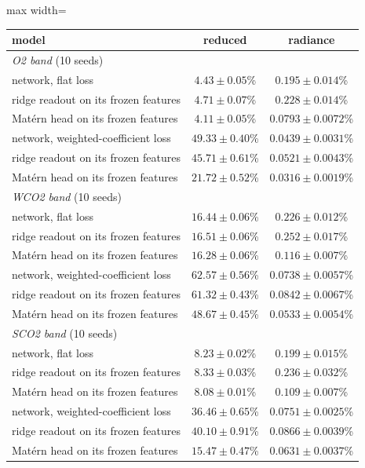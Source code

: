\documentclass[twoside,11pt]{article}
\begin{document}
\begin{table}[t]
\centering

\begin{adjustbox}{max width=\linewidth}
\begin{tabular}{lcc}
\toprule
model & reduced & radiance \\
\midrule
\multicolumn{3}{l}{\emph{O2 band} (10 seeds)} \\
network, flat loss & $4.43\pm0.05$\% & $0.195\pm0.014$\% \\
\quad ridge readout on its frozen features & $4.71\pm0.07$\% & $0.228\pm0.014$\% \\
\quad Mat\'ern head on its frozen features & $4.11\pm0.05$\% & $0.0793\pm0.0072$\% \\
network, weighted-coefficient loss & $49.33\pm0.40$\% & $0.0439\pm0.0031$\% \\
\quad ridge readout on its frozen features & $45.71\pm0.61$\% & $0.0521\pm0.0043$\% \\
\quad Mat\'ern head on its frozen features & $21.72\pm0.52$\% & $0.0316\pm0.0019$\% \\
\multicolumn{3}{l}{\emph{WCO2 band} (10 seeds)} \\
network, flat loss & $16.44\pm0.06$\% & $0.226\pm0.012$\% \\
\quad ridge readout on its frozen features & $16.51\pm0.06$\% & $0.252\pm0.017$\% \\
\quad Mat\'ern head on its frozen features & $16.28\pm0.06$\% & $0.116\pm0.007$\% \\
network, weighted-coefficient loss & $62.57\pm0.56$\% & $0.0738\pm0.0057$\% \\
\quad ridge readout on its frozen features & $61.32\pm0.43$\% & $0.0842\pm0.0067$\% \\
\quad Mat\'ern head on its frozen features & $48.67\pm0.45$\% & $0.0533\pm0.0054$\% \\
\multicolumn{3}{l}{\emph{SCO2 band} (10 seeds)} \\
network, flat loss & $8.23\pm0.02$\% & $0.199\pm0.015$\% \\
\quad ridge readout on its frozen features & $8.33\pm0.03$\% & $0.236\pm0.032$\% \\
\quad Mat\'ern head on its frozen features & $8.08\pm0.01$\% & $0.109\pm0.007$\% \\
network, weighted-coefficient loss & $36.46\pm0.65$\% & $0.0751\pm0.0025$\% \\
\quad ridge readout on its frozen features & $40.10\pm0.91$\% & $0.0866\pm0.0039$\% \\
\quad Mat\'ern head on its frozen features & $15.47\pm0.47$\% & $0.0631\pm0.0037$\% \\
\bottomrule
\end{tabular}
\end{adjustbox}


\end{table}
\end{document}
